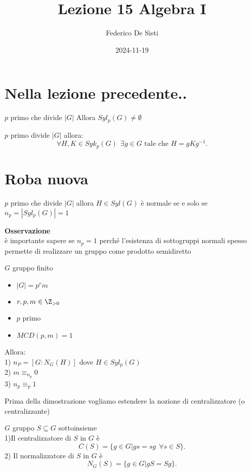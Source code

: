 \documentclass[12px]{article}
\title{Lezione 15 Algebra I}
\date{2024-11-19}
\author{Federico De Sisti}
\begin{document}
	\maketitle
	\newpage
	\section{Nella lezione precedente..}
	\begin{teo}
		$p$ primo che divide $|G|$ Allora
		 $Syl_p(G)\neq\emptyset$
	\end{teo}
	\begin{teo}
		$p$ primo divide $|G|$ allora:
		\[
			\forall H,K\in Syk_p(G) \ \ \exists g\in G \text{ tale che } H=gKg^{-1}
		.\] 

	\end{teo}
	\section{Roba nuova}
		\begin{coro}
			$p$ primo che divide $|G|$ allora  $H\in Syl(G)$ è normale se e solo se\\ $n_p = |Syl_p(G)| = 1$
		\end{coro}
		\textbf{Osservazione}\\
		è importante sapere se $n_p = 1$ perché l'esistenza di sottogruppi normali spesso permette di realizzare un gruppo come prodotto semidiretto
	\\
	\begin{teo}
		$G$ gruppo finito
		\begin{itemize}
			\item $|G| = p^r m$
			\item $r,p,m\in \Z_{>0}$
			\item $p$ primo
			\item $MCD(p,m) = 1$
		\end{itemize}
		Allora:\\
		1) $n_P = [G:N_G(H)]$ dove  $H\in Syl_p(G)$ \\
		2) $m\equiv_{n_p} 0$\\
		3)  $n_p\equiv_p 1$
	\end{teo}
	Prima della dimostrazione vogliamo estendere la nozione di centralizzatore (o centralizzante)
	\newpage
	\begin{defi}[Normalizzatore]
		$G$ gruppo $S\subseteq G$ sottoinsieme\\
		1)Il centralizzatore di  $S$ in  $G$ è
		 \[
			 C(S) = \{g\in G| gs = sg \ \ \forall s\in S\}
		.\] 
		2) Il normalizzatore di $S$ in $G$ è 
		\[
			N_G(S) = \{g\in G | gS = Sg\}
		.\] 
	\end{defi}
\end{document}
